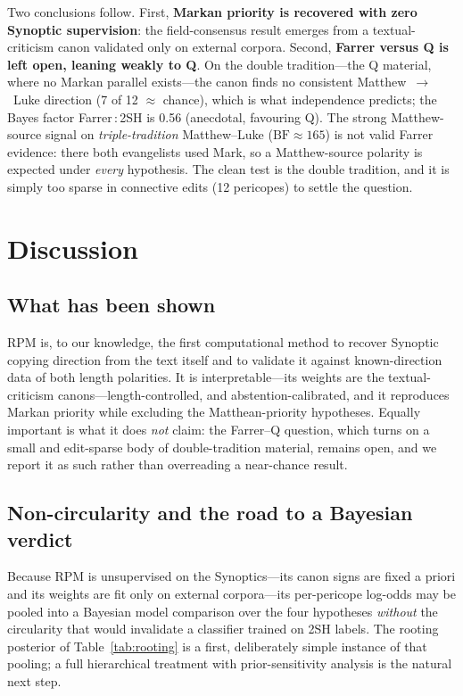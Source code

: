 \documentclass[11pt,letterpaper]{article}
\begin{document}
Two conclusions follow. First, \textbf{Markan priority is recovered with zero Synoptic
supervision}: the field-consensus result emerges from a textual-criticism canon validated only on
external corpora. Second, \textbf{Farrer versus Q is left open, leaning weakly to Q}. On the
double tradition---the Q material, where no Markan parallel exists---the canon finds no consistent
Matthew~$\rightarrow$~Luke direction (7 of 12 $\approx$ chance), which is what independence
predicts; the Bayes factor Farrer\,:\,2SH is 0.56 (anecdotal, favouring Q). The strong
Matthew-source signal on \textit{triple-tradition} Matthew--Luke ($\mathrm{BF}\approx165$) is not
valid Farrer evidence: there both evangelists used Mark, so a Matthew-source polarity is expected
under \textit{every} hypothesis. The clean test is the double tradition, and it is simply too
sparse in connective edits (12 pericopes) to settle the question.

\section{Discussion}
\label{sec:discussion}

\subsection{What has been shown}

RPM is, to our knowledge, the first computational method to recover Synoptic copying direction
from the text itself and to validate it against known-direction data of both length polarities.
It is interpretable---its weights are the textual-criticism canons---length-controlled, and
abstention-calibrated, and it reproduces Markan priority while excluding the Matthean-priority
hypotheses. Equally important is what it does \textit{not} claim: the Farrer--Q question, which
turns on a small and edit-sparse body of double-tradition material, remains open, and we report it
as such rather than overreading a near-chance result.

\subsection{Non-circularity and the road to a Bayesian verdict}

Because RPM is unsupervised on the Synoptics---its canon signs are fixed a priori and its weights
are fit only on external corpora---its per-pericope log-odds may be pooled into a Bayesian model
comparison over the four hypotheses \textit{without} the circularity that would invalidate a
classifier trained on 2SH labels. The rooting posterior of Table~\ref{tab:rooting} is a first,
deliberately simple instance of that pooling; a full hierarchical treatment with prior-sensitivity
analysis is the natural next step.
\end{document}
